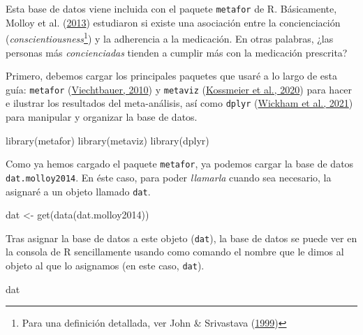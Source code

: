 \documentclass[
  bookmarksnumbered]{article}
\newenvironment{Shaded}{\begin{snugshade}}{\end{snugshade}}
\newcommand{\FunctionTok}[1]{\textcolor[rgb]{0.39,0.29,0.61}{#1}}
\newcommand{\NormalTok}[1]{\textcolor[rgb]{0.12,0.11,0.11}{#1}}
\newcommand{\OtherTok}[1]{\textcolor[rgb]{0.00,0.43,0.16}{#1}}
\begin{document}
Esta base de datos viene incluida con el paquete \texttt{metafor} de R. Básicamente, Molloy et al. (\protect\hyperlink{ref-molloy2013}{2013}) estudiaron si existe una asociación entre la concienciación (\emph{conscientiousness}\footnote{Para una definición detallada, ver John \& Srivastava (\protect\hyperlink{ref-johnBigFiveTrait1999}{1999})}) y la adherencia a la medicación. En otras palabras, ¿las personas más \emph{concienciadas} tienden a cumplir más con la medicación prescrita?

Primero, debemos cargar los principales paquetes que usaré a lo largo de esta guía: \texttt{metafor} (\protect\hyperlink{ref-viechtbauer2010}{Viechtbauer, 2010}) y \texttt{metaviz} (\protect\hyperlink{ref-KossmeierMetaviz}{Kossmeier et al., 2020}) para hacer e ilustrar los resultados del meta-análisis, así como \texttt{dplyr} (\protect\hyperlink{ref-WickhamDplyr2021}{Wickham et al., 2021}) para manipular y organizar la base de datos.

\begin{Shaded}
\begin{Highlighting}[]
\FunctionTok{library}\NormalTok{(metafor)}
\FunctionTok{library}\NormalTok{(metaviz)}
\FunctionTok{library}\NormalTok{(dplyr)}
\end{Highlighting}
\end{Shaded}

Como ya hemos cargado el paquete \texttt{metafor}, ya podemos cargar la base de datos \texttt{dat.molloy2014}. En éste caso, para poder \emph{llamarla} cuando sea necesario, la asignaré a un objeto llamado \texttt{dat}.

\begin{Shaded}
\begin{Highlighting}[]
\NormalTok{dat }\OtherTok{\textless{}{-}} \FunctionTok{get}\NormalTok{(}\FunctionTok{data}\NormalTok{(dat.molloy2014))}
\end{Highlighting}
\end{Shaded}

Tras asignar la base de datos a este objeto (\texttt{dat}), la base de datos se puede ver en la consola de R sencillamente usando como comando el nombre que le dimos al objeto al que lo asignamos (en este caso, \texttt{dat}).

\begin{Shaded}
\begin{Highlighting}[]
\NormalTok{dat}
\end{Highlighting}
\end{Shaded}
\end{document}
